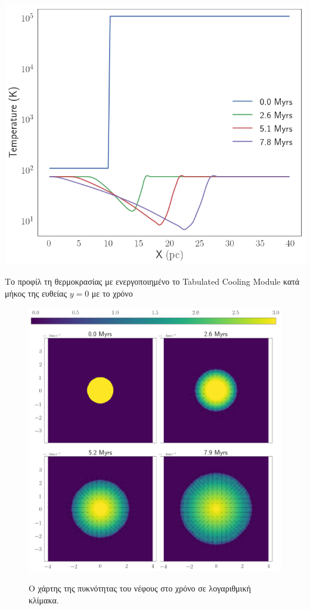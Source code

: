 	
\begin{marginfigure}
	\centering
	\includegraphics[width=1\linewidth]{DataImages/TabCoolingTMPprofile}
	\caption{Το προφίλ τη θερμοκρασίας με ενεργοποιημένο το Tabulated Cooling Module κατά μήκος της ευθείας $y=0$ με το χρόνο}
	\label{fig:tabcoolingtmpprofile}
\end{marginfigure}
	
	
	\begin{figure}[h]
		\centering
		\caption{Ο χάρτης της πυκνότητας του νέφους στο χρόνο σε λογαριθμική κλίμακα.}
		\includegraphics[width=1.0\linewidth]{DataImages/TabCoolingRHOquad}
		\label{fig:TabCoolingRHOquad}
	\end{figure}
		

